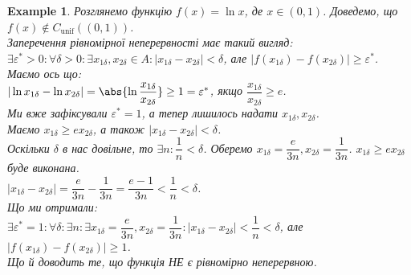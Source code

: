 \documentclass[a4paper, 14pt]{article}
\theoremstyle{theoremdd}
\theoremstyle{theoremdd}
\theoremstyle{theoremdd}
\theoremstyle{theoremdd}
\newtheorem{example}[theorem]{Example}
\theoremstyle{theoremdd}
\theoremstyle{theoremdd}
\theoremstyle{theoremdd}
\theoremstyle{theoremdd}
\begin{document}
\begin{example}
Розглянемо функцію $f(x) = \ln x$, де $x \in (0,1)$. Доведемо, що $f(x) \not\in C_{\text{unif}}((0,1))$.\\
Заперечення рівномірної неперервності має такий вигляд:\\
$\exists \varepsilon^* > 0: \forall \delta > 0: \exists x_{1 \delta},x_{2 \delta} \in A: |x_{1 \delta}-x_{2 \delta}|<\delta$, але $|f(x_{1 \delta}) - f(x_{2 \delta})| \geq \varepsilon^*$.\\
Маємо ось що:\\
$|\ln x_{1 \delta} - \ln x_{2 \delta}| = \abs{\ln \dfrac{x_{1 \delta}}{x_{2 \delta}}} \geq 1 = \varepsilon^*$, якщо $\dfrac{x_{1 \delta}}{x_{2 \delta}} \geq e$.\\
Ми вже зафіксували $\varepsilon^* = 1$, а тепер лишилось надати $x_{1 \delta}, x_{2 \delta}$.\\
Маємо $x_{1 \delta} \geq e x_{2 \delta}$, а також $|x_{1 \delta} - x_{2 \delta}| < \delta$.\\
Оскільки $\delta$ в нас довільне, то $\exists n: \dfrac{1}{n} < \delta$. Оберемо $x_{1 \delta} = \dfrac{e}{3n}, x_{2 \delta} = \dfrac{1}{3n}$.
$x_{1 \delta} \geq e x_{2 \delta}$ буде виконана.\\
$|x_{1 \delta} - x_{2 \delta}| = \dfrac{e}{3n} - \dfrac{1}{3n} = \dfrac{e-1}{3n} < \dfrac{1}{n} < \delta$.\\
Що ми отримали:\\
$\exists \varepsilon^* = 1: \forall \delta: \exists n: \exists x_{1 \delta} = \dfrac{e}{3n}, x_{2 \delta} = \dfrac{1}{3n}: |x_{1 \delta} - x_{2 \delta}| < \dfrac{1}{n} < \delta$, але $|f(x_{1\delta}) - f(x_{2 \delta})| \geq 1$.\\
Що й доводить те, що функція НЕ є рівномірно неперервною.
\\ \iffalse %
\begin{figure}[H]
\centering
{}
\end{figure}
\end{example}
\end{document}
